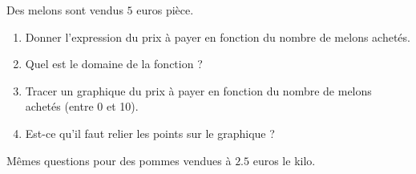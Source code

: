 
\begin{exercice}\label{exoSeconde-0059}

Des melons sont vendus $5$ euros pièce. 
\begin{enumerate}
    \item
        Donner l'expression du prix à payer en fonction du nombre de melons achetés. 
    \item
        Quel est le domaine de la fonction ?
    \item
        Tracer un graphique du prix à payer en fonction du nombre de melons achetés (entre 0 et 10).
    \item
        Est-ce qu'il faut relier les points sur le graphique ?
\end{enumerate}

Mêmes questions pour des pommes vendues à \( 2.5\) euros le kilo. 

\end{exercice}
